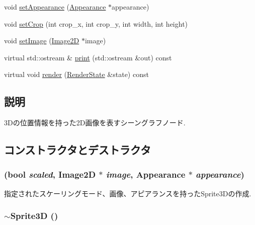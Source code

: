 \begin{CompactItemize}
\item 
void \hyperlink{classm3g_1_1Sprite3D_b9b44bad4241635062ed66437c9bae48}{setAppearance} (\hyperlink{classm3g_1_1Appearance}{Appearance} $\ast$appearance)
\item 
void \hyperlink{classm3g_1_1Sprite3D_35ca6d3ff64f2232a0f3a11bf4ab483e}{setCrop} (int crop\_\-x, int crop\_\-y, int width, int height)
\item 
void \hyperlink{classm3g_1_1Sprite3D_705b89b41cd1b38f664ed912be44baaa}{setImage} (\hyperlink{classm3g_1_1Image2D}{Image2D} $\ast$image)
\item 
virtual std::ostream \& \hyperlink{classm3g_1_1Sprite3D_6fea17fa1532df3794f8cb39cb4f911f}{print} (std::ostream \&out) const 
\item 
virtual void \hyperlink{classm3g_1_1Sprite3D_8babc8a79b78615da51161e94029eea9}{render} (\hyperlink{structm3g_1_1RenderState}{RenderState} \&state) const 
\end{CompactItemize}


\subsection{説明}
3Dの位置情報を持った2D画像を表すシーングラフノード. 

\subsection{コンストラクタとデストラクタ}
\hypertarget{classm3g_1_1Sprite3D_9cb33fd453d441ed8e99b95f5e29df0c}{
\subsubsection[{Sprite3D}]{ (bool {\em scaled}, \/  {\bf Image2D} $\ast$ {\em image}, \/  {\bf Appearance} $\ast$ {\em appearance})}}
\label{classm3g_1_1Sprite3D_9cb33fd453d441ed8e99b95f5e29df0c}


指定されたスケーリングモード、画像、アピアランスを持ったSprite3Dの作成. \hypertarget{classm3g_1_1Sprite3D_a57bd1e3141ba11c88ddec1e46c188d6}{
\subsubsection[{$\sim$Sprite3D}]{\setlength{\rightskip}{0pt plus 5cm}$\sim${\bf Sprite3D} ()}}
\label{classm3g_1_1Sprite3D_a57bd1e3141ba11c88ddec1e46c188d6}


